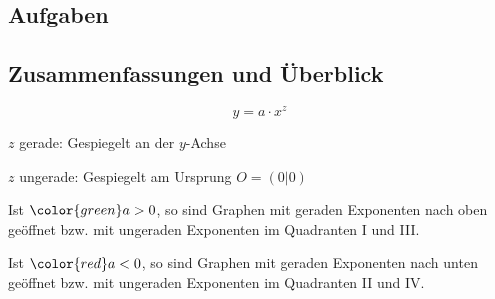 \subsection*{Aufgaben}
\newpage

\subsection{Zusammenfassungen und
  Überblick}

$$y = a\cdot{}x^z$$

$z$ gerade: Gespiegelt an der $y$-Achse

$z$ ungerade: Gespiegelt am Ursprung $O=(0|0)$

Ist ${\color{green}a>0}$, so sind Graphen mit
geraden Exponenten nach oben geöffnet bzw. mit ungeraden Exponenten im
Quadranten I und III.

Ist ${\color{red}a<0}$, so sind Graphen mit
geraden Exponenten nach unten geöffnet bzw. mit ungeraden Exponenten
im Quadranten II und IV.


\newpage

